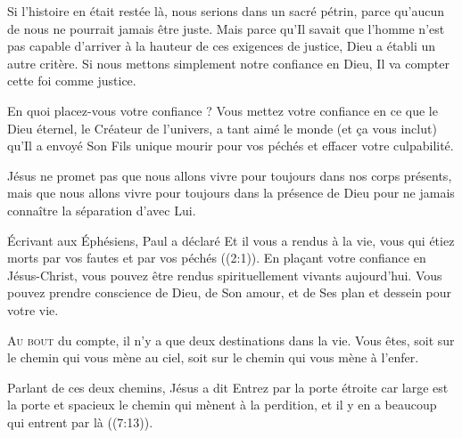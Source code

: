 Si l'histoire en était restée là, nous serions dans un sacré pétrin,
 parce qu'aucun de nous ne pourrait jamais être juste.
 Mais parce qu'Il savait que l'homme n'est pas capable d'arriver
 à la hauteur de ces exigences de justice, Dieu a établi un autre critère.
 Si nous mettons simplement notre confiance en Dieu,
 Il va compter cette foi comme justice. 

En quoi placez-vous votre confiance ?
 Vous mettez votre confiance en ce que le Dieu éternel,
 le Créateur de l'univers, a tant aimé le monde (et \c{c}a vous inclut)
 qu'Il a envoyé Son Fils unique mourir pour vos péchés
 et effacer votre culpabilité. 


Jésus ne promet pas que nous allons vivre pour toujours
 dans nos corps présents, mais que nous allons vivre pour toujours
 dans la présence de Dieu
 \ocadr pour ne jamais connaître la séparation d'avec Lui. 

Écrivant aux Éphésiens, Paul a déclaré\frcolon{}
 \Og Et il vous a rendus à la vie, vous qui étiez morts par vos fautes
 et par vos péchés \Fg{} ((2:1)).
 En pla\c{c}ant votre confiance en Jésus-Christ, vous pouvez être rendus
 spirituellement vivants aujourd'hui.
 Vous pouvez prendre conscience de Dieu, de Son amour, et de Ses plan
 et dessein pour votre vie. 

\dvrule







\lettrine{A}{u bout} du compte, il n'y a que deux destinations dans la vie.
 Vous êtes, soit sur le chemin qui vous mène au ciel,
 soit sur le chemin qui vous mène à l'enfer.

Parlant de ces deux chemins, Jésus a dit\frcolon{} 
 \Og Entrez par la porte étroite car large est la porte et spacieux le chemin
 qui mènent à la perdition,
 et il y en a beaucoup qui entrent par là \Fg{}
 ((7:13)).

